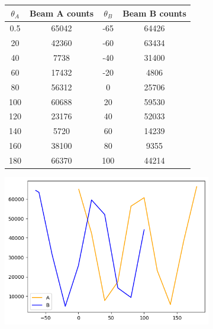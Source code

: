 \documentclass[10pt]{article}
\begin{document}
	\begin{figure}
		\centering
		\begin{subfigure}{0.45\textwidth}
			\begin{tabular}{|c|c|c|c|}
				\hline
				\textbf{$\theta_A$} & \textbf{Beam A counts} & \textbf{$\theta_B$} & \textbf{Beam B counts} \\ \hline
				0.5                                     & 65042                & -65                                     & 64426                \\ 
				20                                      & 42360                & -60                                     & 63434                \\
				40                                      & 7738                 & -40                                     & 31400                \\
				60                                      & 17432                & -20                                     & 4806                 \\
				80                                      & 56312                & 0                                       & 25706                \\
				100                                     & 60688                & 20                                      & 59530                \\
				120                                     & 23176                & 40                                      & 52033                \\
				140                                     & 5720                 & 60                                      & 14239                \\
				160                                     & 38100                & 80                                      & 9355                 \\
				180                                     & 66370                & 100                                     & 44214                \\ \hline
			\end{tabular}
			\caption{}
			\label{count-table}
		\end{subfigure}
		\begin{subfigure}{0.45\textwidth}
			\includegraphics[scale=0.5]{images/contrast.png}	

\end{subfigure}
\end{figure}
\end{document}
